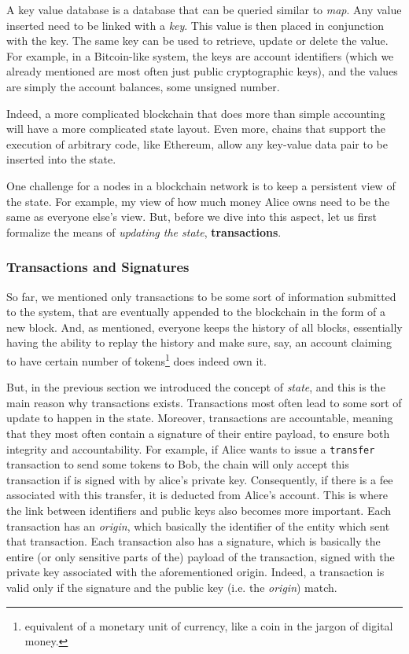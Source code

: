 A key value database is a database that can be queried similar to \textit{map}. Any value inserted
need to be linked with a \textit{key}. This value is then placed in conjunction with the key. The
same key can be used to retrieve, update or delete the value. For example, in a Bitcoin-like system,
the keys are account identifiers (which we already mentioned are most often just public
cryptographic keys), and the values are simply the account balances, some unsigned number.

Indeed, a more complicated blockchain that does more than simple accounting will have a more
complicated state layout. Even more, chains that support the execution of arbitrary code, like
Ethereum, allow any key-value data pair to be inserted into the state.

One challenge for a nodes in a blockchain network is to keep a persistent view of the state. For
example, my view of how much money Alice owns need to be the same as everyone else's view. But,
before we dive into this aspect, let us first formalize the means of \textit{updating the state},
\textbf{transactions}.

\subsubsection{Transactions and Signatures} \label{chap_bg:subsec:transaction_sig}

So far, we mentioned only transactions to be some sort of information submitted to the system, that
are eventually appended to the blockchain in the form of a new block. And, as mentioned, everyone
keeps the history of all blocks, essentially having the ability to replay the history and make sure,
say, an account claiming to have certain number of tokens\footnote{equivalent of a monetary unit of
currency, like a coin in the jargon of digital money.} does indeed own it.

But, in the previous section we introduced the concept of \textit{state}, and this is the main
reason why transactions exists. Transactions most often lead to some sort of update to happen in the
state. Moreover, transactions are accountable, meaning that they most often contain a signature of
their entire payload, to ensure both integrity and accountability. For example, if Alice wants to
issue a \texttt{transfer} transaction to send some tokens to Bob, the chain will only accept this
transaction if is signed with by alice's private key. Consequently, if there is a fee associated
with this transfer, it is deducted from Alice's account. This is where the link between identifiers
and public keys also becomes more important. Each transaction has an \textit{origin}, which
basically the identifier of the entity which sent that transaction. Each transaction also has a
signature, which is basically the entire (or only sensitive parts of the) payload of the
transaction, signed with the private key associated with the aforementioned origin. Indeed, a
transaction is valid only if the signature and the public key (i.e. the \textit{origin}) match.

